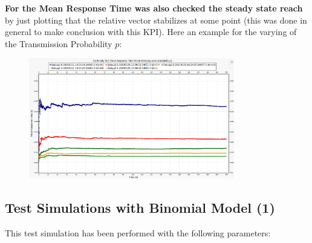 \textbf{For the Mean Response Time was also checked the steady state reach} by just plotting that the relative vector stabilizes at some point (this was done in general to make conclusion with this KPI). Here an example for the varying of the Transmission Probability $p$:
\begin{figure}[H]
	\centering
	\includegraphics[width=0.8\textwidth]{img/ContinuityTest_ResponseTime_VectorP.png}
	\label {img: responseTimeConvergence}
\end{figure}
\subsection{Test Simulations with Binomial Model (1)}
This test simulation has been performed with the following parameters:

